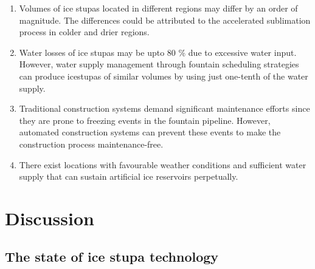 \begin{enumerate} 

\item Volumes of ice stupas located in different regions may differ by an order of magnitude. The differences
  could be attributed to the accelerated sublimation process in colder and drier regions.

\item Water losses of ice stupas may be upto 80 \% due to excessive water input. However, water supply
  management through fountain scheduling strategies can produce icestupas of similar volumes by using just
  one-tenth of the water supply.

\item Traditional construction systems demand significant maintenance efforts since they are prone to freezing
  events in the fountain pipeline. However, automated construction systems can prevent these events to make the
  construction process maintenance-free.

\item There exist locations with favourable weather conditions and sufficient water supply that can sustain
  artificial ice reservoirs perpetually.

\end{enumerate}

\section{Discussion}




\subsection{The state of ice stupa technology}


